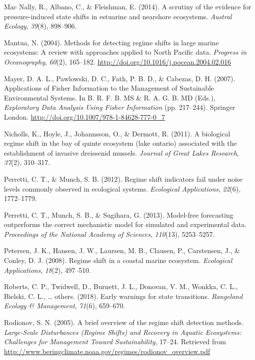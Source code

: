 \documentclass[12pt,twoside,openany]{reedthesis}
\begin{document}
\hypertarget{ref-mac2014scrutiny}{}
Mac Nally, R., Albano, C., \& Fleishman, E. (2014). A scrutiny of the
evidence for pressure-induced state shifts in estuarine and nearshore
ecosystems. \emph{Austral Ecology}, \emph{39}(8), 898--906.

\hypertarget{ref-mantua_methods_2004}{}
Mantua, N. (2004). Methods for detecting regime shifts in large marine
ecosystems: A review with approaches applied to North Pacific data.
\emph{Progress in Oceanography}, \emph{60}(2), 165--182.
\url{http://doi.org/10.1016/j.pocean.2004.02.016}

\hypertarget{ref-mayer_applications_2007}{}
Mayer, D. A. L., Pawlowski, D. C., Fath, P. B. D., \& Cabezas, D. H.
(2007). Applications of Fisher Information to the Management of
Sustainable Environmental Systems. In B. R. F. B. MS \& R. A. G. B. MD
(Eds.), \emph{Exploratory Data Analysis Using Fisher Information} (pp.
217--244). Springer London.
\url{http://doi.org/10.1007/978-1-84628-777-0_7}

\hypertarget{ref-nicholls2011biological}{}
Nicholls, K., Hoyle, J., Johannsson, O., \& Dermott, R. (2011). A
biological regime shift in the bay of quinte ecosystem (lake ontario)
associated with the establishment of invasive dreissenid mussels.
\emph{Journal of Great Lakes Research}, \emph{37}(2), 310--317.

\hypertarget{ref-perretti2012regime}{}
Perretti, C. T., \& Munch, S. B. (2012). Regime shift indicators fail
under noise levels commonly observed in ecological systems.
\emph{Ecological Applications}, \emph{22}(6), 1772--1779.

\hypertarget{ref-perretti_model-free_2013}{}
Perretti, C. T., Munch, S. B., \& Sugihara, G. (2013). Model-free
forecasting outperforms the correct mechanistic model for simulated and
experimental data. \emph{Proceedings of the National Academy of
Sciences}, \emph{110}(13), 5253--5257.

\hypertarget{ref-petersen2008regime}{}
Petersen, J. K., Hansen, J. W., Laursen, M. B., Clausen, P., Carstensen,
J., \& Conley, D. J. (2008). Regime shift in a coastal marine ecosystem.
\emph{Ecological Applications}, \emph{18}(2), 497--510.

\hypertarget{ref-roberts2018early}{}
Roberts, C. P., Twidwell, D., Burnett, J. L., Donovan, V. M., Wonkka, C.
L., Bielski, C. L., \ldots{} others. (2018). Early warnings for state
transitions. \emph{Rangeland Ecology \& Management}, \emph{71}(6),
659--670.

\hypertarget{ref-rodionov_brief_2005}{}
Rodionov, S. N. (2005). A brief overview of the regime shift detection
methods. \emph{Large-Scale Disturbances (Regime Shifts) and Recovery in
Aquatic Ecosystems: Challenges for Management Toward Sustainability},
17--24. Retrieved from
\url{http://www.beringclimate.noaa.gov/regimes/rodionov_overview.pdf}
\end{document}
